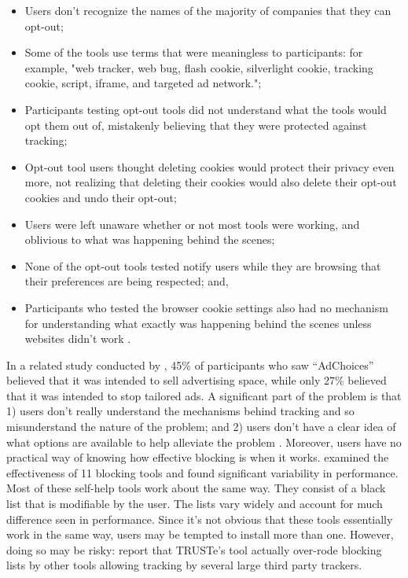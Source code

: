 \begin{sloppier}
\begin{itemize}
\item Users don't recognize the names of the majority of companies that they can opt-out;
\item Some of the tools use terms that were meaningless to participants: for example, "web tracker, web bug, flash cookie, silverlight cookie, tracking cookie, script, iframe, and targeted ad network.";
\item Participants testing opt-out tools did not understand what the tools would opt them out of, mistakenly believing that they were protected against tracking;
\item Opt-out tool users thought deleting cookies would protect their privacy even more, not realizing that deleting their cookies would also delete their opt-out cookies and undo their opt-out;
\item Users were left unaware whether or not most tools were working, and oblivious to what was happening behind the scenes;
\item None of the opt-out tools tested notify users while they are browsing that their preferences are being respected; and,
\item Participants who tested the browser cookie settings also had no mechanism for understanding what exactly was happening behind the scenes unless websites didn't work \citep{Leon:2012vu}.
\end{itemize}
\end{sloppier}

In a related study conducted by  \cite*{Leon:2012dk},  45\% of participants who saw ``AdChoices'' believed that it was intended to sell advertising space, while only 27\% believed that it was intended to stop tailored ads.
A significant part of the problem is that 1) users don't really understand the mechanisms behind tracking and so misunderstand the nature of the problem; and 2) users don't have a clear idea of what options are available to help alleviate the problem  \citep{McDonald:2010vv, Ur:2012ws}.  Moreover, users have no practical way of knowing how effective blocking is when it works.  \cite{Mayer:2012wt}  examined the effectiveness of 11 blocking tools and found significant variability in performance. Most of these self-help tools work about the same way. They consist of a black list that is modifiable by the user. The lists vary widely and account for much difference seen in performance. Since it's not obvious that these tools essentially work in the same way, users may be tempted to install more than one. However, doing so may be risky:  \cite{Mayer:2012wt}  report that TRUSTe's tool actually over-rode blocking lists by other tools allowing tracking by several large third party trackers.

